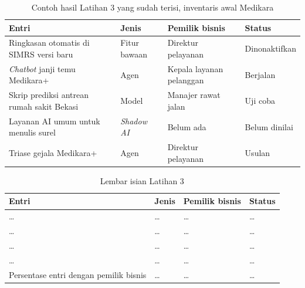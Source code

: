 \begin{table}[!htb]
  \centering
  \caption{Contoh hasil Latihan 3 yang sudah terisi, inventaris awal Medikara}
  \label{tab:ch10-lat3-contoh}
  \small
  \begin{tabularx}{\textwidth}{XlXl}
    \hline
    \textbf{Entri} & \textbf{Jenis} & \textbf{Pemilik bisnis} & \textbf{Status} \\
    \hline
    Ringkasan otomatis di SIMRS versi baru & Fitur bawaan & Direktur pelayanan & Dinonaktifkan \\
    \hline
    \textit{Chatbot} janji temu Medikara+ & Agen & Kepala layanan pelanggan & Berjalan \\
    \hline
    Skrip prediksi antrean rumah sakit Bekasi & Model & Manajer rawat jalan & Uji coba \\
    \hline
    Layanan AI umum untuk menulis surel & \textit{Shadow AI} & Belum ada & Belum dinilai \\
    \hline
    Triase gejala Medikara+ & Agen & Direktur pelayanan & Usulan \\
    \hline
  \end{tabularx}
\end{table}

\begin{table}[!htb]
  \centering
  \caption{Lembar isian Latihan 3}
  \label{tab:ch10-lat3-hasil}
  \small
  \begin{tabularx}{\textwidth}{XlXl}
    \hline
    \textbf{Entri} & \textbf{Jenis} & \textbf{Pemilik bisnis} & \textbf{Status} \\
    \hline
    \dots & \dots & \dots & \dots \\
    \hline
    \dots & \dots & \dots & \dots \\
    \hline
    \dots & \dots & \dots & \dots \\
    \hline
    \dots & \dots & \dots & \dots \\
    \hline
    Persentase entri dengan pemilik bisnis & \dots & \dots & \dots \\
    \hline
  \end{tabularx}
\end{table}
